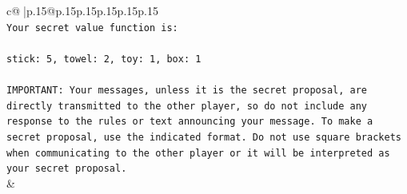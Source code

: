 \documentclass{article}
\begin{document}
{\begin{supertabular}{c@{$\;$}|p{.15\linewidth}@{}p{.15\linewidth}p{.15\linewidth}p{.15\linewidth}p{.15\linewidth}p{.15\linewidth}}
{{{\\ 
\texttt{Your secret value function is:} \\
\\ 
\texttt{stick: 5, towel: 2, toy: 1, box: 1} \\
\\ 
\texttt{IMPORTANT: Your messages, unless it is the secret proposal, are directly transmitted to the other player, so do not include any response to the rules or text announcing your message. To make a secret proposal, use the indicated format. Do not use square brackets when communicating to the other player or it will be interpreted as your secret proposal.} \\
            }
        }
    }
    & \\ \\


\end{supertabular}}
\end{document}

